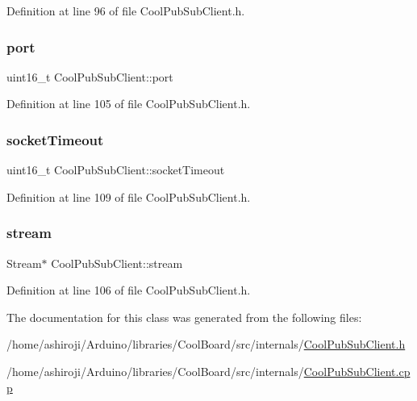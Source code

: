 Definition at line 96 of file Cool\+Pub\+Sub\+Client.\+h.

\mbox{\label{class_cool_pub_sub_client_a01e3249102c057756af7a515c179844e}} 
\subsubsection{\texorpdfstring{port}{port}}
{\footnotesize\ttfamily uint16\+\_\+t Cool\+Pub\+Sub\+Client\+::port\hspace{0.3cm}{\ttfamily [private]}}



Definition at line 105 of file Cool\+Pub\+Sub\+Client.\+h.

\mbox{\label{class_cool_pub_sub_client_a2d7b7c7dda1313ff1492b158c3712630}} 
\subsubsection{\texorpdfstring{socket\+Timeout}{socketTimeout}}
{\footnotesize\ttfamily uint16\+\_\+t Cool\+Pub\+Sub\+Client\+::socket\+Timeout\hspace{0.3cm}{\ttfamily [private]}}



Definition at line 109 of file Cool\+Pub\+Sub\+Client.\+h.

\mbox{\label{class_cool_pub_sub_client_a7a92417b317e7bd9502ed37752111705}} 
\subsubsection{\texorpdfstring{stream}{stream}}
{\footnotesize\ttfamily Stream$\ast$ Cool\+Pub\+Sub\+Client\+::stream\hspace{0.3cm}{\ttfamily [private]}}



Definition at line 106 of file Cool\+Pub\+Sub\+Client.\+h.



The documentation for this class was generated from the following files\+:\begin{DoxyCompactItemize}
\item 
/home/ashiroji/\+Arduino/libraries/\+Cool\+Board/src/internals/\hyperlink{_cool_pub_sub_client_8h}{Cool\+Pub\+Sub\+Client.\+h}\item 
/home/ashiroji/\+Arduino/libraries/\+Cool\+Board/src/internals/\hyperlink{_cool_pub_sub_client_8cpp}{Cool\+Pub\+Sub\+Client.\+cpp}\end{DoxyCompactItemize}
